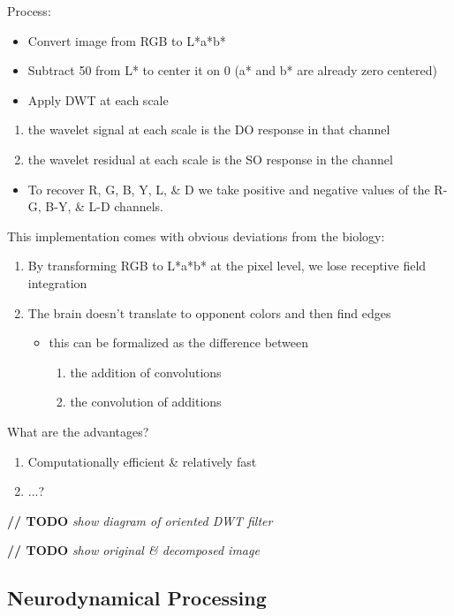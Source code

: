 \documentclass[journal,onecolumn]{IEEEtran}
\begin{document}
Process:
\begin{itemize}
    \item Convert image from RGB to L*a*b*
    \item Subtract 50 from L* to center it on 0 (a* and b* are already zero centered)
    \item Apply DWT at each scale
\end{itemize}
\begin{enumerate}
    \item the wavelet signal at each scale is the DO response in that channel
    \item the wavelet residual at each scale is the SO response in the channel
\end{enumerate}
\begin{itemize}
    \item To recover R, G, B, Y, L, \& D we take positive and negative values of the R-G, B-Y, \& L-D channels.
\end{itemize}

This implementation comes with obvious deviations from the biology:
\begin{enumerate}
    \item By transforming RGB to L*a*b* at the pixel level, we lose receptive field integration
    \item The brain doesn't translate to opponent colors and then find edges
    \begin{itemize}
        \item this can be formalized as the difference between
        \begin{enumerate}
            \item the addition of convolutions
            \item the convolution of additions
        \end{enumerate}
    \end{itemize}
\end{enumerate}

What are the advantages?
\begin{enumerate}
    \item Computationally efficient \& relatively fast
    \item ...?
\end{enumerate}

\textbf{// TODO} \textit{show diagram of oriented DWT filter}

\textbf{// TODO} \textit{show original \& decomposed image}


\subsection*{Neurodynamical Processing}
\end{document}
